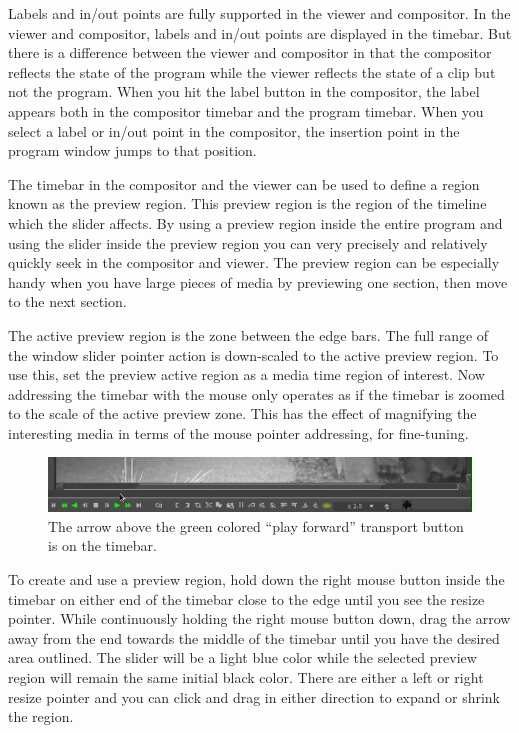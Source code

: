 Labels and in/out points are fully supported in the viewer and compositor.  
In the viewer and compositor, labels and in/out points are displayed in the timebar.  
But there is a difference between the viewer and compositor in that the compositor reflects the state of the program while the viewer reflects the state of a clip but not the program. 
When you hit the label button in the compositor, the label appears both in the compositor timebar and the program timebar. 
When you select a label or in/out point in the compositor, the insertion point in the program window jumps to that position. 

The timebar in the compositor and the viewer can be used to define a region known as the preview region.  
This preview region is the region of the timeline which the slider affects.  
By using a preview region inside the entire program and using the slider inside the preview region you can very precisely and relatively quickly seek in the compositor and viewer.  
The preview region can be especially handy when you have large pieces of media by previewing one section, then move to the next section.  

The active preview region is the zone between the edge bars.  
The full range of the window slider pointer action is down-scaled to the active preview region.   
To use this, set the preview active region as a media time region of interest.  
Now addressing the timebar with the mouse only operates as if the timebar is zoomed to the scale of the active preview zone.  
This has the effect of magnifying the interesting media in terms of the mouse pointer addressing, for fine-tuning.

\begin{figure}[htpb]
    \centering
    \includegraphics[width=0.8\linewidth]{images/timebar1.png}
    \caption{The arrow above the green colored “play forward” transport button is on the timebar.}
    \label{fig:timebar1}
\end{figure}

To create and use a preview region, hold down the right mouse button inside the timebar on either end of the timebar close to the edge until you see the resize pointer.  
While continuously holding the right mouse button down, drag the arrow away from the end towards the middle of the timebar until you have the desired area outlined.  
The slider will be a light blue color while the selected preview region will remain the same initial black color.  
There are either a left or right resize pointer and you can click and drag in either direction to expand or shrink the region.

